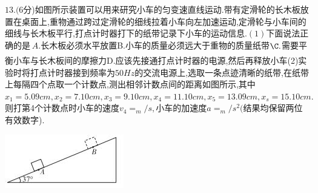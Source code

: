 \question[6] $13.(6$分)如图所示装置可以用来研究小车的匀变速直线运动.带有定滑轮的长木板放置在桌面上,重物通过跨过定滑轮的细线拉着小车向左加速运动,定滑轮与小车间的细线与长木板平行,打点计时器打下的纸带记录下小车的运动信息$.(1)$下面说法正确的是$______.A.$长木板必须水平放置B.小车的质量必须远大于重物的质量纸带$\C.$需要平衡小车与长木板间的摩擦力D.应该先接通打点计时器的电源,然后再释放小车(2)实验时将打点计时器接到频率为$50Hz$的交流电源上,选取一条点迹清晰的纸带,在纸带上每隔四个点取一个计数点,测出相邻计数点间的距离如图所示,其中$x_1=5.09cm,x_2=7.10cm,x_3=9.10cm,x_4=11.10cm,x_5=13.09cm,x_s=15.10cm.$则打第4个计数点时小车的速度$v_4=_m/s,$小车的加速度$a=_m/s^2($结果均保留两位有效数字).
\begin{center}
\includegraphics[]{img/image13.jpeg}
\end{center}

